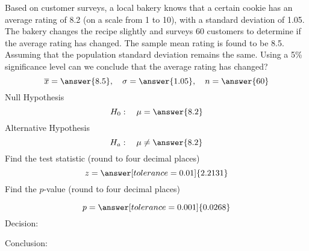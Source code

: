 \documentclass{ximera}
\begin{document}
 \begin{problem}\label{prob:140hom8prob3}
Based on customer surveys, a local bakery knows that a certain cookie has an average rating of 8.2 (on a scale from 1 to 10), with a standard deviation of 1.05.  The bakery changes the recipe slightly and  surveys 60 customers to determine if the average rating has changed.  The sample mean rating is found to be 8.5. Assuming that the population standard deviation remains the same. Using a 5\% significance level can we conclude that the average rating has changed?
$$\overline{x}=\answer{8.5},\quad \sigma=\answer{1.05},\quad n=\answer{60}$$
Null Hypothesis
$$H_0:\quad \mu=\answer{8.2}$$
Alternative Hypothesis
$$H_a:\quad \mu\neq\answer{8.2}$$
Find the test statistic (round to four decimal places)
$$z=\answer[tolerance=0.01]{2.2131}$$
Find the $p$-value (round to four decimal places)
\begin{center}  
\end{center}
$$p=\answer[tolerance=0.001]{0.0268}$$
Decision:

\begin{multipleChoice} 
\end{multipleChoice}  

Conclusion:

\begin{multipleChoice} 
\end{multipleChoice} 

\end{problem}
\end{document}
